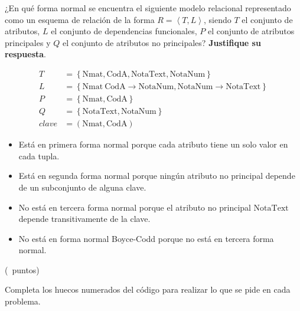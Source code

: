\documentclass[12pt,a4paper,addpoints,answers]{exam}
\begin{document}
\begin{questions}
\begin{parts}
  ¿En qué forma normal se encuentra el siguiente modelo relacional representado como un esquema de relación de la forma $R=\left < T, L\right >$, siendo $T$ el conjunto de atributos, $L$ el conjunto de dependencias funcionales, $P$ el conjunto de atributos principales y $Q$ el conjunto de atributos no principales? \textbf{Justifique su respuesta}.
  
  \begin{align*}
  T &= \left \{ \textrm{Nmat}, \textrm{CodA}, \textrm{NotaText}, \textrm{NotaNum} \right \}\\
  L &= \left \{ \textrm{Nmat}\ \textrm{CodA} \longrightarrow \textrm{NotaNum}, \textrm{NotaNum}\longrightarrow \textrm{NotaText}\right \}\\
  P &= \left \{ \textrm{Nmat}, \textrm{CodA} \right \}\\
  Q &= \left \{ \textrm{NotaText}, \textrm{NotaNum} \right \}\\
  clave &= \left ( \textrm{Nmat}, \textrm{CodA} \right )
  \end{align*}
  
  \begin{solutionorbox}
    \begin{itemize}
        \item Está en primera forma normal porque cada atributo tiene un solo valor en cada tupla.
        \item Está en segunda forma normal porque ningún atributo no principal depende de un subconjunto de alguna clave.
        \item No está en tercera forma normal porque el atributo no principal $\textrm{NotaText}$ depende transitivamente de la clave.
        \item No está en forma normal Boyce-Codd porque no está en tercera forma normal.
    \end{itemize}
  \end{solutionorbox}
  \end{parts}
  
  \label{question:programatico}
  (\totalpoints\ puntos) \textbf{\large\thequestiontitle}
  
  Completa los huecos numerados del código para realizar lo que se pide en cada problema.

\end{questions}
\end{document}
